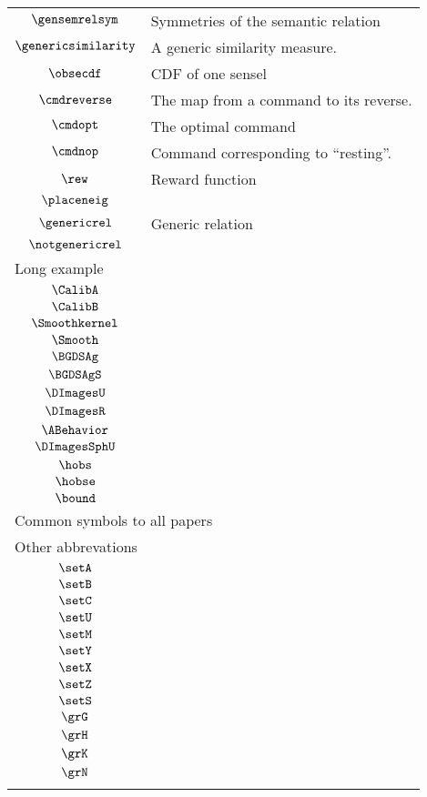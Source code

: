 \begin{longtable}{cl}
 $\gensemrelsym$ &  Symmetries of the semantic relation\\ 
 $\genericsimilarity$ &  A generic similarity measure.\\ 
 $\obsecdf$ &  CDF of one sensel\\ 
 $\cmdreverse$ &  The map from a command to its reverse.\\ 
 $\cmdopt$ &  The optimal command\\ 
 $\cmdnop$ &  Command corresponding to ``resting''.\\ 
 $\rew$ &  Reward function\\ 
 $\placeneig$ & \\ 
 $\genericrel$ &  Generic relation\\ 
 $\notgenericrel$ & \\ 
 \multicolumn{2}{l}{Long example}\\ 
 \hline
$\CalibA$ & \\ 
 $\CalibB$ & \\ 
 $\Smoothkernel$ & \\ 
 $\Smooth$ & \\ 
 $\BGDSAg$ & \\ 
 $\BGDSAgS$ & \\ 
 $\DImagesU$ & \\ 
 $\DImagesR$ & \\ 
 $\ABehavior$ & \\ 
 $\DImagesSphU$ & \\ 
 $\hobs$ & \\ 
 $\hobse$ & \\ 
 $\bound$ & \\ 
 \multicolumn{2}{l}{Common symbols to all papers}\\ 
 \hline
\hline
\multicolumn{2}{l}{Other abbrevations}\\ 
 \hline
$\setA$ & \\ 
 $\setB$ & \\ 
 $\setC$ & \\ 
 $\setU$ & \\ 
 $\setM$ & \\ 
 $\setY$ & \\ 
 $\setX$ & \\ 
 $\setZ$ & \\ 
 $\setS$ & \\ 
 $\grG$ & \\ 
 $\grH$ & \\ 
 $\grK$ & \\ 
 $\grN$ & \\ 
 \multicolumn{2}{l}{}\\ 

\end{longtable}
